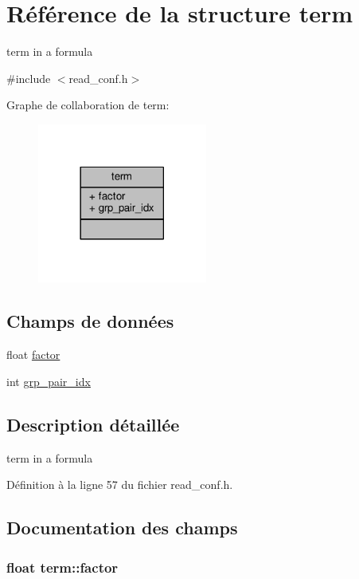 \hypertarget{structterm}{\section{Référence de la structure term}
\label{structterm}
}


term in a formula  




{\ttfamily \#include $<$read\+\_\+conf.\+h$>$}



Graphe de collaboration de term\+:\nopagebreak
\begin{figure}[H]
\begin{center}
\leavevmode
\includegraphics[width=158pt]{structterm__coll__graph}
\end{center}
\end{figure}
\subsection*{Champs de données}
\begin{DoxyCompactItemize}
\item 
float \hyperlink{structterm_a0e3099fefaeda94c8f11abcfe8eb071f}{factor}
\item 
int \hyperlink{structterm_aad99db478acafec56675d26230546978}{grp\+\_\+pair\+\_\+idx}
\end{DoxyCompactItemize}


\subsection{Description détaillée}
term in a formula 

Définition à la ligne 57 du fichier read\+\_\+conf.\+h.



\subsection{Documentation des champs}
\hypertarget{structterm_a0e3099fefaeda94c8f11abcfe8eb071f}{
\subsubsection[{factor}]{\setlength{\rightskip}{0pt plus 5cm}float term\+::factor}}\label{structterm_a0e3099fefaeda94c8f11abcfe8eb071f}


